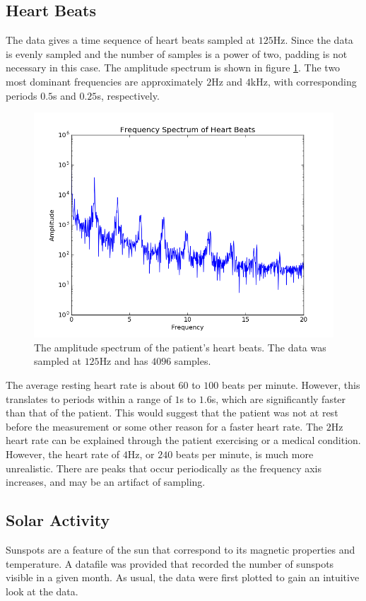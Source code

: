 \documentclass[twocolumn]{article}
\begin{document}
\subsection{Heart Beats}
The data gives a time sequence of heart beats sampled at $125$Hz. Since the data
is evenly sampled and the number of samples is a power of two, padding is not
necessary in this case. The amplitude spectrum is shown in figure
\ref{fig:beats}. The two most dominant frequencies are approximately $2$Hz and
$4$kHz, with corresponding periods $0.5$s and $0.25$s, respectively.

\begin{figure}
  \includegraphics[width=\linewidth]{beats.png}
  \caption{
    The amplitude spectrum of the patient's heart beats. The data was sampled at
    $125$Hz and has $4096$ samples.
  }
  \label{fig:beats}
\end{figure}

The average resting heart rate is about $60$ to $100$ beats per minute. However,
this translates to periods within a range of $1$s to $1.6$s, which are
significantly faster than that of the patient. This would suggest that the
patient was not at rest before the measurement or some other reason for a faster
heart rate. The $2$Hz heart rate can be explained through the patient
exercising or a medical condition. However, the heart rate of $4$Hz,
or $240$ beats per minute, is much more unrealistic. There are peaks
that occur periodically as the frequency axis increases, and may be an
artifact of sampling.

\subsection{Solar Activity}
Sunspots are a feature of the sun that correspond to its magnetic properties and temperature. A datafile was provided that recorded the number of sunspots visible in a given month. As usual, the data were first plotted to gain an intuitive look at the data.
\end{document}
